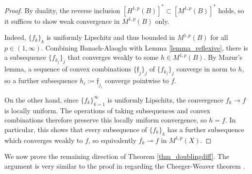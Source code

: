 \documentclass[reqno]{amsart}
\theoremstyle{plain}
\theoremstyle{definition}
\theoremstyle{remark}
\numberwithin{equation}{section}
\newcommand{\f}{\mathfrak{f}}
\begin{document}
\begin{proof}
By duality, the reverse inclusion $[H^{1,p}(B)]^* \subset [M^{1,p}(B)]^*$ holds, so it suffices to show weak convergence in $M^{1,p}(B)$ only.

Indeed, $\{f_k\}_k$ is uniformly Lipschitz and thus bounded in $M^{1,p}(B)$ for all $p \in (1,\infty)$.  Combining Banach-Alaoglu with Lemma \ref{lemma_reflexive}, there is a subsequence $\{f_{k_j}\}_j$ that converges weakly to some $ h \in M^{1,p}(B)$.  By Mazur's lemma, a sequence of convex combinations $\{\f_j\}_j$ of $\{f_{k_j}\}_j$ converge in norm to $h$, so a further subsequence $h_i := \f_{j_i}$ converge pointwise to $f$.

On the other hand, since $\{f_k\}_{k=1}^\infty$ is uniformly Lipschitz, the convergence $f_k \to f$ is locally uniform.  The operations of taking subsequences and convex combinations therefore preserve this locally uniform convergence, so $h = f$.  In particular, this shows that every subsequence of $\{f_k\}_k$ has a further subsequence which converges weakly to $f$, so equivalently $f_k \rightharpoonup f$ in $M^{1,p}(X)$.
\end{proof}

We now prove the remaining direction of Theorem \ref{thm_doublingdiff}.  The argument is very similar to the proof in \cite{Gong} regarding the Cheeger-Weaver theorem \cite{WeaverED}.
\end{document}
